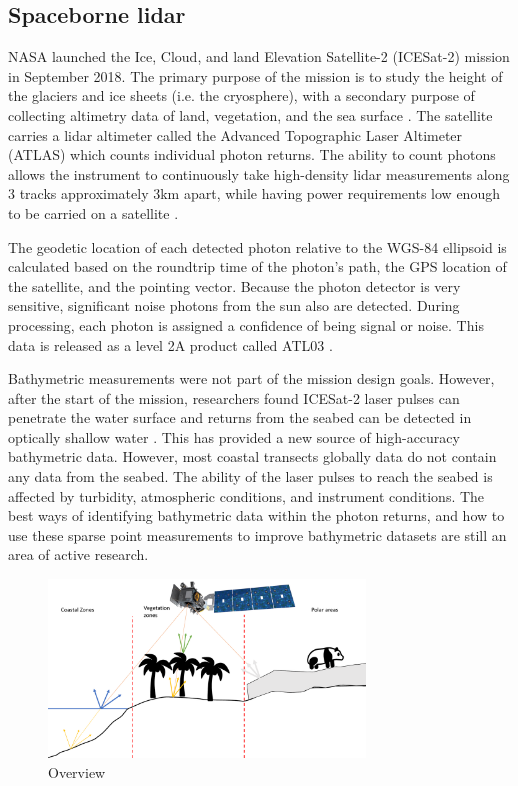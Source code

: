 \subsection{Spaceborne lidar}

NASA launched the Ice, Cloud, and land Elevation Satellite-2 (ICESat-2) mission in September 2018. The primary purpose of the mission is to study the height of the glaciers and ice sheets (i.e. the cryosphere), with a secondary purpose of collecting altimetry data of land, vegetation, and the sea surface \parencite{Markus2017}. The satellite carries a lidar altimeter called the Advanced Topographic Laser Altimeter (ATLAS) which counts individual photon returns. The ability to count photons allows the instrument to continuously take high-density lidar measurements along 3 tracks approximately 3km apart, while having power requirements low enough to be carried on a satellite \parencite{Popescu2018}. 

The geodetic location of each detected photon relative to the WGS-84 ellipsoid is calculated based on the roundtrip time of the photon's path, the GPS location of the satellite, and the pointing vector. Because the photon detector is very sensitive, significant noise photons from the sun also are detected. During processing, each photon is assigned a confidence of being signal or noise. This data is released as a level 2A product called ATL03 \parencite{Neumann2019d}.

Bathymetric measurements were not part of the mission design goals. However, after the start of the mission, researchers found ICESat-2 laser pulses can penetrate the water surface and returns from the seabed can be detected in optically shallow water \parencite{Parrish2019}. This has provided a  new source of high-accuracy bathymetric data. However, most coastal transects globally data do not contain any data from the seabed. The ability of the laser pulses to reach the seabed is affected by turbidity, atmospheric conditions, and instrument conditions. The best ways of identifying bathymetric data within the photon returns, and how to use these sparse point measurements to improve bathymetric datasets are still an area of active research.


\begin{figure}[h!]
      \centering
      \includegraphics[width=0.75\textwidth]{figures/summary.pdf}
      \caption{Overview}
      \label{fig:icesat-summary-image}
  \end{figure}
  

